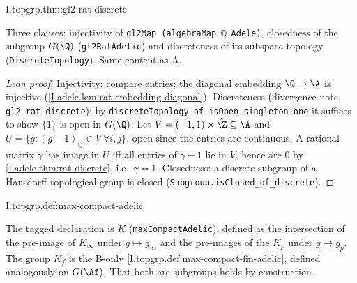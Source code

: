 \begin{theorem}[$G(\Q)$ is discrete]
\end{theorem}
\begin{tfformal}{I.topgrp.thm:gl2-rat-discrete}
\begin{tffidelity}
Three clauses: injectivity of \texttt{gl2Map (algebraMap ℚ Adele)}, closedness of the subgroup $G(\Q)$ (\texttt{gl2RatAdelic}) and discreteness of its subspace topology (\texttt{DiscreteTopology}). Same content as A.
\end{tffidelity}
\end{tfformal}
\begin{proof}[Lean proof]
Injectivity: compare entries; the diagonal embedding $\Q\to\A$ is injective (\cref{I.adele.lem:rat-embedding-diagonal}). Discreteness (divergence note, \texttt{gl2-rat-discrete}): by \texttt{discreteTopology\_of\_isOpen\_singleton\_one} it suffices to show $\{1\}$ is open in $G(\Q)$. Let $V=(-1,1)\times\hat\Z\subseteq\A$ and $U=\{g:(g-1)_{ij}\in V\ \forall i,j\}$, open since the entries are continuous. A rational matrix $\gamma$ has image in $U$ iff all entries of $\gamma-1$ lie in $V$, hence are $0$ by \cref{I.adele.thm:rat-discrete}, i.e.\ $\gamma=1$. Closedness: a discrete subgroup of a Hausdorff topological group is closed (\texttt{Subgroup.isClosed\_of\_discrete}).
\end{proof}

\begin{definition}
\end{definition}
\begin{tfformal}{I.topgrp.def:max-compact-adelic}
\begin{tffidelity}
The tagged declaration is $K$ (\texttt{maxCompactAdelic}), defined as the intersection of the pre-image of $K_\infty$ under $g\mapsto g_\infty$ and the pre-images of the $K_p$ under $g\mapsto g_p$. The group $K_f$ is the B-only \cref{I.topgrp.def:max-compact-fin-adelic}, defined analogously on $G(\Af)$. That both are subgroups holds by construction.
\end{tffidelity}
\end{tfformal}

